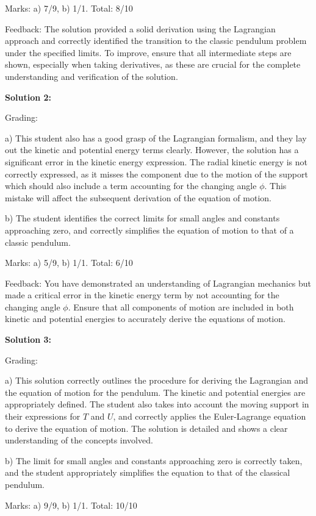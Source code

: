 \documentclass[a4paper,11pt]{article}
\begin{document}
Marks: a) 7/9, b) 1/1. Total: 8/10

Feedback: The solution provided a solid derivation using the Lagrangian approach and correctly identified the transition to the classic pendulum problem under the specified limits. To improve, ensure that all intermediate steps are shown, especially when taking derivatives, as these are crucial for the complete understanding and verification of the solution.

\textbf{Solution 2:}

Grading:

a) This student also has a good grasp of the Lagrangian formalism, and they lay out the kinetic and potential energy terms clearly. However, the solution has a significant error in the kinetic energy expression. The radial kinetic energy is not correctly expressed, as it misses the component due to the motion of the support which should also include a term accounting for the changing angle \( \phi \). This mistake will affect the subsequent derivation of the equation of motion.

b) The student identifies the correct limits for small angles and constants approaching zero, and correctly simplifies the equation of motion to that of a classic pendulum.

Marks: a) 5/9, b) 1/1. Total: 6/10

Feedback: You have demonstrated an understanding of Lagrangian mechanics but made a critical error in the kinetic energy term by not accounting for the changing angle \( \phi \). Ensure that all components of motion are included in both kinetic and potential energies to accurately derive the equations of motion.

\textbf{Solution 3:}

Grading:

a) This solution correctly outlines the procedure for deriving the Lagrangian and the equation of motion for the pendulum. The kinetic and potential energies are appropriately defined. The student also takes into account the moving support in their expressions for \( T \) and \( U \), and correctly applies the Euler-Lagrange equation to derive the equation of motion. The solution is detailed and shows a clear understanding of the concepts involved.

b) The limit for small angles and constants approaching zero is correctly taken, and the student appropriately simplifies the equation to that of the classical pendulum.

Marks: a) 9/9, b) 1/1. Total: 10/10
\end{document}
